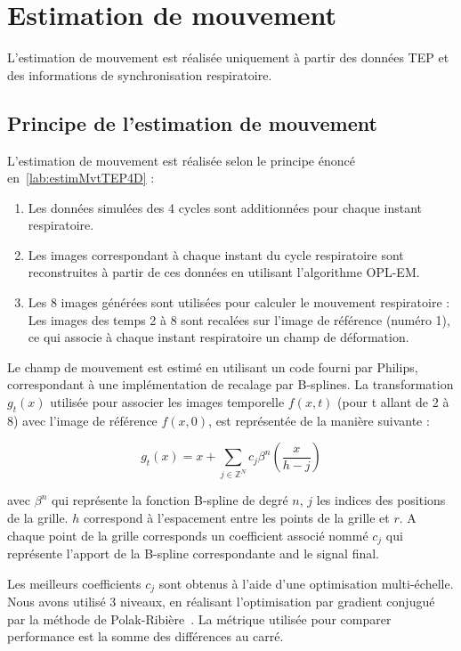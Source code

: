 \section{Estimation de mouvement}

L'estimation de mouvement est réalisée uniquement à partir des données TEP et des informations de synchronisation respiratoire. 

\subsection{Principe de l'estimation de mouvement}

L'estimation de mouvement est réalisée selon le principe énoncé en~\ref{lab:estimMvtTEP4D} :
\begin{enumerate}
 \item Les données simulées des 4 cycles sont additionnées pour chaque instant respiratoire.
 \item Les images correspondant à chaque instant du cycle respiratoire sont reconstruites à partir de ces données en utilisant l'algorithme OPL-EM.
 \item Les 8 images générées sont utilisées pour calculer le mouvement respiratoire : Les images des temps 2 à 8 sont recalées sur l'image de référence (numéro 1), ce qui associe à chaque instant respiratoire un champ de déformation.
\end{enumerate}


Le champ de mouvement est estimé en utilisant un code fourni par Philips, correspondant à une implémentation de recalage par B-splines. La transformation $g_t(x)$ utilisée pour associer les images temporelle  $f(x,t)$ (pour t allant de 2 à 8) avec l'image de référence $f(x,0)$, est représentée de la manière suivante :

\begin{equation}
  g_t(x)=x + \sum\limits_{j\in \mathbb{Z}^N} c_j \beta^n \left( \frac{x}{h-j} \right)
\end{equation}

avec $\beta^n$ qui représente la fonction B-spline de degré $n$, $j$ les indices des positions de la grille. $h$ correspond à l'espacement entre les points de la grille et $r$. A chaque point de la grille corresponds un coefficient associé nommé $c_j$ qui représente l'apport de la B-spline correspondante and le signal final.

Les meilleurs coefficients $c_j$ sont obtenus à l'aide d'une optimisation multi-échelle. Nous avons utilisé 3 niveaux, en réalisant l'optimisation par gradient conjugué par la méthode de Polak-Ribière~\cite{polak1969note}. La métrique utilisée pour comparer performance est la somme des différences au carré. 


